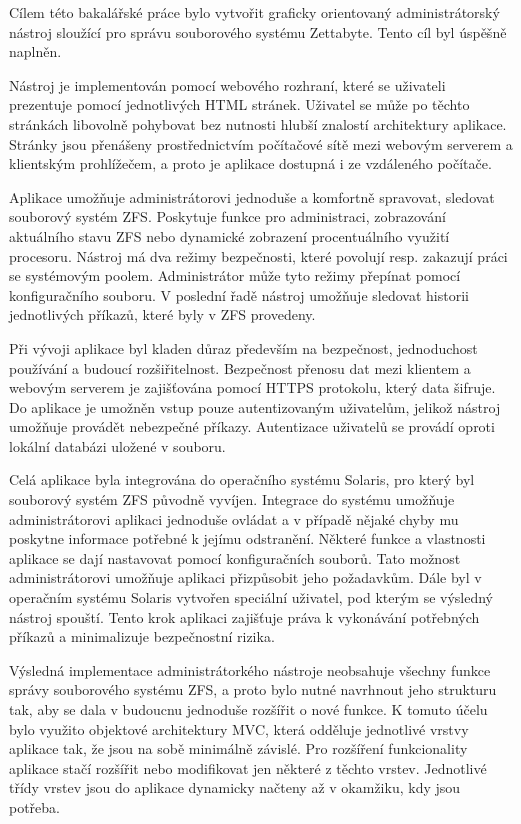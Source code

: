 Cílem této bakalářské práce bylo vytvořit graficky orientovaný administrátorský nástroj sloužící pro správu souborového systému Zettabyte. Tento cíl byl úspěšně naplněn.

Nástroj je implementován pomocí webového rozhraní, které se uživateli prezentuje pomocí jednotlivých HTML stránek. Uživatel se může po těchto stránkách libovolně pohybovat bez nutnosti hlubší znalostí architektury aplikace. Stránky jsou přenášeny prostřednictvím počítačové sítě mezi webovým serverem a klientským prohlížečem, a proto je aplikace dostupná i ze vzdáleného počítače.

Aplikace umožňuje administrátorovi jednoduše a komfortně spravovat, sledovat souborový systém ZFS. Poskytuje funkce pro administraci, zobrazování aktuálního stavu ZFS nebo dynamické zobrazení procentuálního využití procesoru. Nástroj má dva režimy bezpečnosti, které povolují resp. zakazují práci se systémovým poolem. Administrátor může tyto režimy přepínat pomocí konfiguračního souboru. V poslední řadě nástroj umožňuje sledovat historii jednotlivých příkazů, které byly v ZFS provedeny.

Při vývoji aplikace byl kladen důraz především na bezpečnost, jednoduchost používání a budoucí rozšiřitelnost. Bezpečnost přenosu dat mezi klientem a webovým serverem je zajišťována pomocí HTTPS protokolu, který data šifruje. Do aplikace je umožněn vstup pouze autentizovaným uživatelům, jelikož nástroj umožňuje provádět nebezpečné příkazy. Autentizace uživatelů se provádí oproti lokální databázi uložené v souboru.

Celá aplikace byla integrována do operačního systému Solaris, pro který byl souborový systém ZFS původně vyvíjen. Integrace do systému umožňuje administrátorovi aplikaci jednoduše ovládat a v případě nějaké chyby mu poskytne informace potřebné k jejímu odstranění. Některé funkce a vlastnosti aplikace se dají nastavovat pomocí konfiguračních souborů. Tato možnost administrátorovi umožňuje aplikaci přizpůsobit jeho požadavkům. Dále byl v operačním systému Solaris vytvořen speciální uživatel, pod kterým se výsledný nástroj spouští. Tento krok aplikaci zajišťuje práva k vykonávání potřebných příkazů a minimalizuje bezpečnostní rizika.

Výsledná implementace administrátorkého nástroje neobsahuje všechny funkce správy souborového systému ZFS, a proto bylo nutné navrhnout jeho strukturu tak, aby se dala v budoucnu jednoduše rozšířit o nové funkce. K tomuto účelu bylo využito objektové architektury MVC, která odděluje jednotlivé vrstvy aplikace tak, že jsou na sobě minimálně závislé. Pro rozšíření funkcionality aplikace stačí rozšířit nebo modifikovat jen některé z těchto vrstev. Jednotlivé třídy vrstev jsou do aplikace dynamicky načteny až v okamžiku, kdy jsou potřeba.

